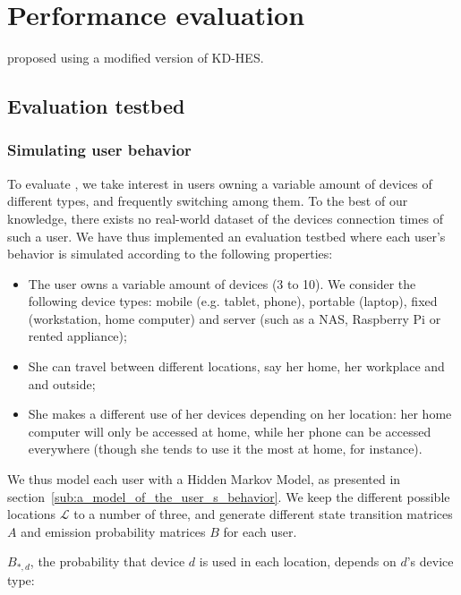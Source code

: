 \section{Performance evaluation}%
\label{Performance}

\Textcite{ANOBE} proposed using a modified version of \ac{KD-HES}.

\subsection{Evaluation testbed} %
\label{sub:evaluation_testbed}



\subsubsection{Simulating user behavior} %
\label{ssub:simulating_user_behavior}


To evaluate \name, we take interest in users owning a variable amount of devices of different types, and frequently switching among them.
To the best of our knowledge, there exists no real-world dataset of the devices connection times of such a user.
We have thus implemented an evaluation testbed where each user's behavior is simulated  according to the following properties:
\begin{itemize}
	\item The user owns a variable amount of devices (3 to 10). We consider the following device types: mobile (e.g. tablet, phone), portable (laptop), fixed (workstation, home computer) and server (such as a NAS, Raspberry Pi or rented appliance);
	\item She can travel between different locations, say her home, her workplace and and outside;
	\item She makes a different use of her devices depending on her location: her home computer will only be accessed at home, while her phone can be accessed everywhere (though she tends to use it the most at home, for instance).
\end{itemize}

We thus model each user with a Hidden Markov Model, as presented in section~\ref{sub:a_model_of_the_user_s_behavior}.
We keep the different possible locations $\mathcal{L}$ to a number of three, and generate different state transition matrices $A$ and emission probability matrices $B$ for each user. 

$B_{*, d}$, the probability that device $d$ is used in each location, depends on $d$'s device type: 

